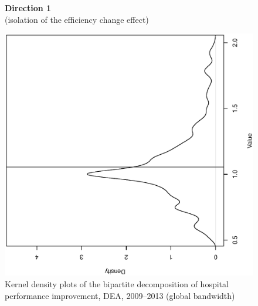 \documentclass[11pt,a4paper,oneside]{article}
\begin{document}
\vspace*{\fill}

\pagebreak
\clearpage



% 







% 










\begin{figure}[htbp]
  \centering
  \caption{Kernel density plots of the bipartite decomposition of hospital performance improvement, DEA, 2009--2013 (global bandwidth)}
  \label{fig:bipartite_densities_DEA}
  {{\bf Direction 1} \\{\footnotesize (isolation of the efficiency change effect)} }\\
\hspace{-35mm}
\begin{minipage}[c]{0.30\textwidth}
  \centering
  \begin{turn}{-90}
  \includegraphics[width=\textwidth,height=1.0\textwidth]{Direction.1/gml_EC_DEA_2009-2013.ps}

\end{turn}
\end{minipage}
\end{figure}
\end{document}
